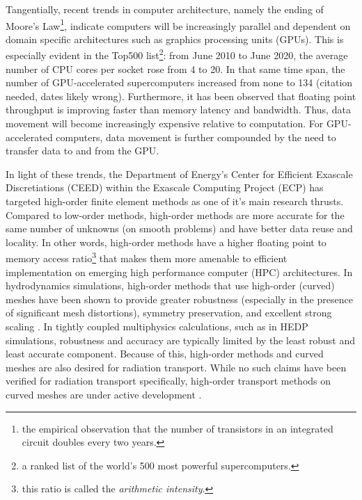 \documentclass[../doc.tex]{subfiles}
\begin{document}
Tangentially, recent trends in computer architecture, namely the ending of Moore's Law\footnote{the empirical observation that the number of transistors in an integrated circuit doubles every two years.}, indicate computers will be increasingly parallel and dependent on domain specific architectures such as graphics processing units (GPUs). This is especially evident in the Top500 list\footnote{a ranked list of the world's 500 most powerful supercomputers.}: from June 2010 to June 2020, the average number of CPU cores per socket rose from 4 to 20. In that same time span, the number of GPU-accelerated supercomputers increased from none to 134 (citation needed, dates likely wrong). Furthermore, it has been observed that floating point throughput is improving faster than memory latency and bandwidth. Thus, data movement will become increasingly expensive relative to computation. For GPU-accelerated computers, data movement is further compounded by the need to transfer data to and from the GPU. 

In light of these trends, the Department of Energy's Center for Efficient Exascale Discretiations (CEED) within the Exascale Computing Project (ECP) has targeted high-order finite element methods as one of it's main research thrusts. Compared to low-order methods, high-order methods are more accurate for the same number of unknowns (on smooth problems) and have better data reuse and locality. In other words, high-order methods have a higher floating point to memory access ratio\footnote{this ratio is called the \emph{arithmetic intensity}.} that makes them more amenable to efficient implementation on emerging high performance computer (HPC) architectures. In hydrodynamics simulations, high-order methods that use high-order (curved) meshes have been shown to provide greater robustness (especially in the presence of significant mesh distortions), symmetry preservation, and excellent strong scaling \cite{blast,blast2,blast3}. In tightly coupled multiphysics calculations, such as in HEDP simulations, robustness and accuracy are typically limited by the least robust and least accurate component. Because of this, high-order methods and curved meshes are also desired for radiation transport. While no such claims have been verified for radiation transport specifically, high-order transport methods on curved meshes are under active development \cite{graph_sweeps,ldrd_dsa,YEE2020109696,olivier_mandc}. 
\end{document}
